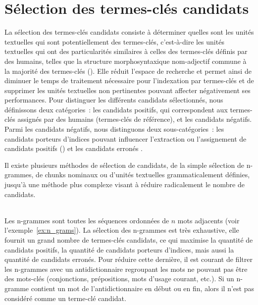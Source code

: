   \section{Sélection des termes-clés candidats}
  \label{sec:main-state_of_the_art-keyphrase_candidate_selection}
    La sélection des termes-clés candidats consiste à déterminer quelles sont
    les unités textuelles qui sont potentiellement des termes-clés, c'est-à-dire
    les unités textuelles qui ont des particularités similaires à celles des
    termes-clés définis par des humains, telles que la structure
    morphosyntaxique nom-adjectif commune à la majorité des termes-clés
    (). Elle réduit l'espace de recherche et permet ainsi de
    diminuer le temps de traitement nécessaire pour l'indexation par termes-clés
    et de supprimer les
    unités textuelles non pertinentes pouvant affecter négativement ses
    performances. Pour distinguer les différents candidats sélectionnés, nous
    définissons deux catégories~: les candidats positifs, qui
    correspondent aux termes-clés assignés par des humains (termes-clés de
    référence), et les candidats négatifs. Parmi les candidats négatifs,
    nous distinguons deux sous-catégories~: les candidats porteurs
    d'indices pouvant influencer l'extraction ou
    l'assignement de candidats positifs () et les candidats
    erronés .

    Il existe plusieurs méthodes de sélection de candidats, de la simple
    sélection de n-grammes, de chunks nominaux ou d'unités textuelles
    grammaticalement définies, jusqu'à une méthode plus complexe visant à
    réduire radicalement le nombre de candidats.

    ~\\Les n-grammes sont
    toutes les séquences ordonnées de $n$ mots adjacents (voir
    l'exemple~\ref{ex:n_grams}). La sélection des n-grammes est très exhaustive,
    elle fournit un grand nombre de termes-clés candidats, ce qui maximise la
    quantité de candidats positifs, la quantité de candidats porteurs d'indices,
    mais aussi la quantité de candidats erronés. Pour réduire cette dernière, il
    est courant de filtrer les n-grammes avec un
    antidictionnaire regroupant les mots ne pouvant pas être des
    mots-clés (conjonctions, prépositions, mots d'usage courant, etc.). Si un
    n-gramme contient un mot de l'antidictionnaire en début ou en fin, alors il
    n'est pas considéré comme un terme-clé candidat.
    
